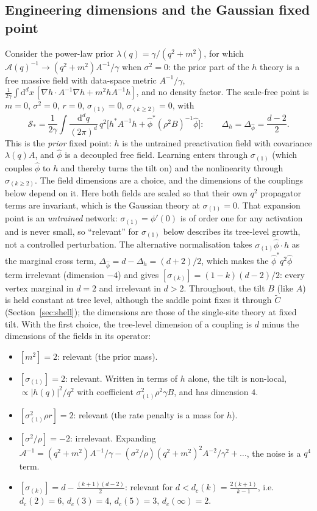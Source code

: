\documentclass[11pt,a4paper]{article}
\newcommand{\Sact}{\mathcal S}
\newcommand{\dd}{\mathrm d}
\newcommand{\Ct}{\tilde C}
\begin{document}
\subsection{Engineering dimensions and the Gaussian fixed point}
Consider the power-law prior $\lambda(q) = \gamma/(q^2+m^2)$, for which $\mathcal A(q)^{-1}\to(q^2+m^2)A^{-1}/\gamma$ when $\sigma^2 = 0$: the prior part of the $h$ theory is a free massive field with data-space metric $A^{-1}/\gamma$, $\frac1{2\gamma}\int\dd^dx\,[\nabla h\cdot A^{-1}\nabla h + m^2hA^{-1}h]$, and no density factor. The scale-free point is $m = 0$, $\sigma^2 = 0$, $r = 0$, $\sigma_{(1)} = 0$, $\sigma_{(k\ge2)} = 0$, with
\begin{equation}
  \Sact_* = \frac1{2\gamma}\int\frac{\dd^dq}{(2\pi)^d}\,q^2\Big[h^{*}A^{-1}h + \hat\phi^{*}(\rho^2B)^{-1}\hat\phi\Big]:
  \qquad
  \Delta_h = \Delta_{\hat\phi} = \frac{d-2}{2} .
\end{equation}
This is the \emph{prior} fixed point: $h$ is the untrained preactivation field with covariance $\lambda(q)A$, and $\hat\phi$ is a decoupled free field. Learning enters through $\sigma_{(1)}$ (which couples $\hat\phi$ to $h$ and thereby turns the tilt on) and the nonlinearity through $\sigma_{(k\ge2)}$. The field dimensions are a choice, and the dimensions of the couplings below depend on it. Here both fields are scaled so that their own $q^2$ propagator terms are invariant, which is the Gaussian theory at $\sigma_{(1)} = 0$. That expansion point is an \emph{untrained} network: $\sigma_{(1)} = \phi'(0)$ is of order one for any activation and is never small, so ``relevant'' for $\sigma_{(1)}$ below describes its tree-level growth, not a controlled perturbation. The alternative normalisation takes $\sigma_{(1)}\hat\phi\cdot h$ as the marginal cross term, $\Delta_{\hat\phi} = d-\Delta_h = (d+2)/2$, which makes the $\hat\phi^{*}q^2\hat\phi$ term irrelevant (dimension $-4$) and gives $[\sigma_{(k)}] = (1-k)(d-2)/2$: every vertex marginal in $d=2$ and irrelevant in $d>2$. Throughout, the tilt $B$ (like $A$) is held constant at tree level, although the saddle point fixes it through $\Ct$ (Section~\ref{sec:shell}); the dimensions are those of the single-site theory at fixed tilt. With the first choice, the tree-level dimension of a coupling is $d$ minus the dimensions of the fields in its operator:
\begin{itemize}
  \item $[m^2] = 2$: relevant (the prior mass).
  \item $[\sigma_{(1)}] = 2$: relevant. Written in terms of $h$ alone, the tilt is non-local, $\propto|h(q)|^2/q^2$ with coefficient $\sigma_{(1)}^2\rho^2\gamma B$, and has dimension $4$.
  \item $[\sigma_{(1)}^2\rho r] = 2$: relevant (the rate penalty is a mass for $h$).
  \item $[\sigma^2/\rho] = -2$: irrelevant. Expanding $\mathcal A^{-1} = (q^2+m^2)A^{-1}/\gamma - (\sigma^2/\rho)(q^2+m^2)^2A^{-2}/\gamma^2 + \dots$, the noise is a $q^4$ term.
  \item $[\sigma_{(k)}] = d - \frac{(k+1)(d-2)}{2}$: relevant for $d<d_c(k) = \frac{2(k+1)}{k-1}$, i.e.\ $d_c(2) = 6$, $d_c(3) = 4$, $d_c(5) = 3$, $d_c(\infty) = 2$.
\end{itemize}
\end{document}
